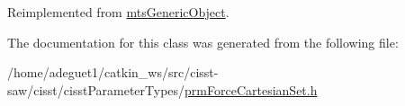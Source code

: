 Reimplemented from \hyperlink{classmts_generic_object_a4916a6c62ee5b167d7c93c88ab72523a}{mts\-Generic\-Object}.



The documentation for this class was generated from the following file\-:\begin{DoxyCompactItemize}
\item 
/home/adeguet1/catkin\-\_\-ws/src/cisst-\/saw/cisst/cisst\-Parameter\-Types/\hyperlink{prm_force_cartesian_set_8h}{prm\-Force\-Cartesian\-Set.\-h}\end{DoxyCompactItemize}
